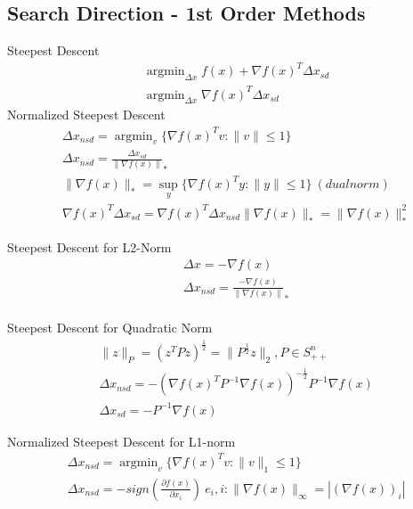 \message{ !name(notebook.tex)}\documentclass[8pt]{report}
\DeclareMathOperator*{\argmin}{argmin}
\newcommand{\norm}[1]{\|#1\|}
\newcommand{\set}[1]{\{#1\}}
\begin{document}
\begin{multicols*}{2}
  \vfill\null
  \columnbreak
  
  \subsection{Search Direction - 1st Order Methods}
  Steepest Descent
  \begin{align*}
    &\argmin_{\Delta x} f(x) + \nabla f(x)^T \Delta x_{sd}\\
    &\argmin_{\Delta x} \nabla f(x)^T \Delta x_{sd}
  \end{align*}
  Normalized Steepest Descent
  \begin{align*}
    &\Delta x_{nsd} = \argmin_{v} \set{ \nabla f(x)^T v : \norm{v} \leq 1 }\\
    &\Delta x_{nsd} = \frac{\Delta x_{sd}}{\norm{\nabla f(x)}}_*\\
    &\norm{\nabla f(x)}_* = \sup_y \{\nabla f(x)^T y: \|y\| \leq 1 \}\ (dual norm)\\
    &\nabla f(x)^T \Delta x_{sd} = \nabla f(x)^T \Delta x_{nsd} \norm{\nabla f(x)}_* = \norm{\nabla f(x)}_*^2
  \end{align*}

  Steepest Descent for L2-Norm
  \begin{align*}
    &\Delta x = -\nabla f(x)\\
    &\Delta x_{nsd} = \frac{-\nabla f(x)}{\norm{\nabla f(x)}}_*\\
  \end{align*}
  
  Steepest Descent for Quadratic Norm
  \begin{align*}
    &\norm{z}_P = (z^TPz)^{\frac{1}{2}} = \norm{P^{\frac{1}{2}}z}_2, P \in S_{++}^n\\
    &\Delta x_{nsd} = -(\nabla f(x)^T P^{-1} \nabla f(x))^{-\frac{1}{2}} P^{-1} \nabla f(x)\\
    &\Delta x_{sd} = -P^{-1} \nabla f(x)
  \end{align*}

  Normalized Steepest Descent for L1-norm
  \begin{align*}
    &\Delta x_{nsd} = \argmin_{v} \set{ \nabla f(x)^T v : \norm{v}_1 \leq 1 }\\
    &\Delta x_{nsd} = - sign (\frac{\partial f(x)}{\partial x_i})\ e_i, i: \norm{\nabla f(x)}_{\infty} = |(\nabla f(x))_i|
  \end{align*}
  \vfill\null  
  \pagebreak
  

\end{multicols*}
\end{document}
